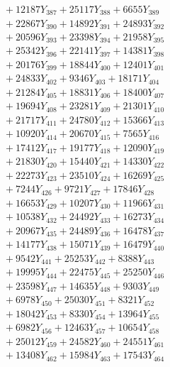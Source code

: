 \documentclass[a4paper,10pt]{article}
\begin{document}
{\begin{align}
&\;  + 12187 Y_{387} + 25117 Y_{388} + 6655 Y_{389} \\[0.5ex]\allowbreak
&\;  + 22867 Y_{390} + 14892 Y_{391} + 24893 Y_{392} \\[0.3ex]
&\;  + 20596 Y_{393} + 23398 Y_{394} + 21958 Y_{395} \\[0.3ex]
&\;  + 25342 Y_{396} + 22141 Y_{397} + 14381 Y_{398} \\[0.3ex]
&\;  + 20176 Y_{399} + 18844 Y_{400} + 12401 Y_{401} \\[0.3ex]
&\;  + 24833 Y_{402} + 9346 Y_{403} + 18171 Y_{404} \\[0.3ex]
&\;  + 21284 Y_{405} + 18831 Y_{406} + 18400 Y_{407} \\[0.3ex]
&\;  + 19694 Y_{408} + 23281 Y_{409} + 21301 Y_{410} \\[0.3ex]
&\;  + 21717 Y_{411} + 24780 Y_{412} + 15366 Y_{413} \\[0.3ex]
&\;  + 10920 Y_{414} + 20670 Y_{415} + 7565 Y_{416} \\[0.3ex]
&\;  + 17412 Y_{417} + 19177 Y_{418} + 12090 Y_{419} \\[0.5ex]\allowbreak
&\;  + 21830 Y_{420} + 15440 Y_{421} + 14330 Y_{422} \\[0.3ex]
&\;  + 22273 Y_{423} + 23510 Y_{424} + 16269 Y_{425} \\[0.3ex]
&\;  + 7244 Y_{426} + 9721 Y_{427} + 17846 Y_{428} \\[0.3ex]
&\;  + 16653 Y_{429} + 10207 Y_{430} + 11966 Y_{431} \\[0.3ex]
&\;  + 10538 Y_{432} + 24492 Y_{433} + 16273 Y_{434} \\[0.3ex]
&\;  + 20967 Y_{435} + 24489 Y_{436} + 16478 Y_{437} \\[0.3ex]
&\;  + 14177 Y_{438} + 15071 Y_{439} + 16479 Y_{440} \\[0.3ex]
&\;  + 9542 Y_{441} + 25253 Y_{442} + 8388 Y_{443} \\[0.3ex]
&\;  + 19995 Y_{444} + 22475 Y_{445} + 25250 Y_{446} \\[0.3ex]
&\;  + 23598 Y_{447} + 14635 Y_{448} + 9303 Y_{449} \\[0.5ex]\allowbreak
&\;  + 6978 Y_{450} + 25030 Y_{451} + 8321 Y_{452} \\[0.3ex]
&\;  + 18042 Y_{453} + 8330 Y_{454} + 13964 Y_{455} \\[0.3ex]
&\;  + 6982 Y_{456} + 12463 Y_{457} + 10654 Y_{458} \\[0.3ex]
&\;  + 25012 Y_{459} + 24582 Y_{460} + 24551 Y_{461} \\[0.3ex]
&\;  + 13408 Y_{462} + 15984 Y_{463} + 17543 Y_{464} \\[0.3ex]

\end{align}}
\end{document}
